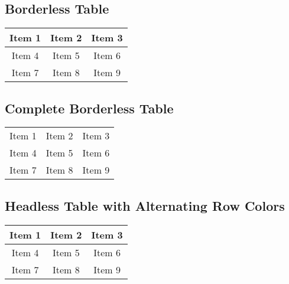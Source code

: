\subsection{Borderless Table}
\begin{center} %
\normalsize %
\begin{tabular}{ccc}
\hline Item 1 & Item 2 & Item 3 \\
\hline Item 4 & Item 5 & Item 6 \\
\hline Item 7 & Item 8 & Item 9 \\
\hline
\end{tabular}
\end{center}

\subsection{Complete Borderless Table}
\begin{center} %
\normalsize %
\begin{tabular}{ccc}
Item 1 & Item 2 & Item 3 \\
Item 4 & Item 5 & Item 6 \\
Item 7 & Item 8 & Item 9 \\
\end{tabular}
\end{center}

\subsection{Headless Table with Alternating Row Colors}
\raggedright
\large
\begin{tabular}{|c|c|c|}
\hline
\rowcolor{codehighlight} Item 1 & Item 2 & Item 3 \\
\hline Item 4 & Item 5 & Item 6 \\
\hline
\rowcolor{codehighlight} Item 7 & Item 8 & Item 9 \\
\hline
\end{tabular}
